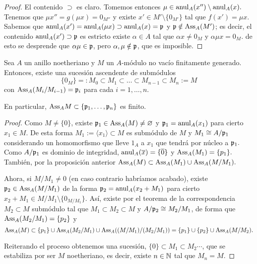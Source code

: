 \documentclass[../main.tex]{subfiles}
\begin{document}
\begin{proof}
El contenido $\supset$ es claro. Tomemos entonces $\mu\in\operatorname{anul}_A(x'')\setminus\operatorname{anul}_A(x).$ Tenemos que $\mu x''=g(\mu x)=0_{M''}$ y existe $x'\in M'\setminus\{0_{M'}\}$ tal que $f(x')=\mu x.$ Sabemos que $\operatorname{anul}_A(x')=\operatorname{anul}_A(\mu x)\supset\operatorname{anul}_A(x)=\mathfrak{p}$ y $\mathfrak{p}\notin\text{Ass}_A(M')$; es decir, el contenido $\operatorname{anul}_A(x')\supset\mathfrak{p}$ es estricto existe $\alpha\in A$ tal que $\alpha x\neq 0_M$ y $\alpha\mu x=0_M.$ de esto se desprende que $\alpha\mu\in\mathfrak{p}$, pero $\alpha,\mu\notin\mathfrak{p}$, que es imposible.
\end{proof}

\begin{proposition}
Sea $A$ un anillo noetheriano y $M$ un $A$-módulo no vacío finitamente generado. Entonces, existe una sucesión ascendente de submódulos $$\{0_M\}=:M_0\subset M_1\subset\dots\subset M_{n-1}\subset M_n:=M$$ con $\text{Ass}_A(M_i/M_{i-1})=\mathfrak{p}_i$ para cada $i=1,\dots,n$.

En particular, $\text{Ass}_AM\subset\{\mathfrak{p}_1,\dots,\mathfrak{p}_n\}$ es finito.
\end{proposition}

\begin{proof}
Como $M\neq\{0\}$, existe $\mathfrak{p}_1\in\text{Ass}_A(M)\neq\varnothing$ y $\mathfrak{p}_1=\operatorname{anul}_A(x_1)$ para cierto $x_1\in M.$ De esta forma $M_1:=\langle x_1\rangle\subset M$ es submódulo de $M$ y $M_1\cong A/{\mathfrak{p}_1}$ considerando un homomorfismo que lleve $1_A$ a $x_1$ que tendrá por núcleo a $\mathfrak{p}_1.$ Como $A/{\mathfrak{p}_1}$ es dominio de integridad, $\operatorname{anul}_A(\overline{x})=\{\overline{0}\}$ y $\text{Ass}_A(M_1)=\{p_1\}.$ También, por la proposición anterior $\text{Ass}_A(M)\subset\text{Ass}_A(M_1)\cup\text{Ass}_A{(M/M_1)}.$

Ahora, si $M/M_1\neq 0$ (en caso contrario habríamos acabado), existe $\mathfrak{p}_2\in\text{Ass}_A(M/M_1)$ de la forma $\mathfrak{p}_2=\operatorname{anul}_A(x_2+ M_1)$ para cierto $x_2+ M_1\in M/M_1\setminus\{0_{M/M_1}\}.$ Así, existe por el teorema de la correspondencia $M_2\subset M$ submódulo tal que $M_1\subset M_2\subset M$ y $A/{\mathfrak{p}_2}\cong M_2/M_1$, de forma que $\text{Ass}_A(M_2/M_1)=\{p_2\}$ y
\begin{equation*}
    \text{Ass}_A(M)\subset\{p_1\}\cup\text{Ass}_A(M_2/M_1)\cup\text{Ass}_A((M/M_1)/(M_2/M_1))\\
    =\{p_1\}\cup\{p_2\}\cup\text{Ass}_A(M/M_2).
\end{equation*}

Reiterando el proceso obtenemos una sucesión, $\{0\}\subset M_1\subset M_2\cdots$, que se estabiliza por ser $M$ noetheriano, es decir, existe $n\in\mathbb{N}$ tal que $M_n=M.$
 \end{proof}
\end{document}

